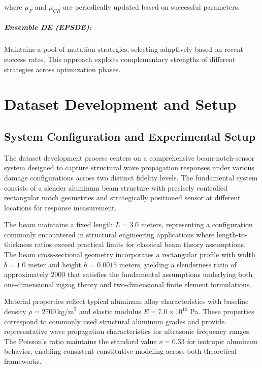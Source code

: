 \documentclass[12pt,a4paper]{report}
\begin{document}
where $\mu_F$ and $\mu_{CR}$ are periodically updated based on successful parameters.

\paragraph{Ensemble DE (EPSDE):}

Maintains a pool of mutation strategies, selecting adaptively based on recent success rates. This approach exploits complementary strengths of different strategies across optimization phases.


\chapter{Dataset Development and Setup}

\section{System Configuration and Experimental Setup}

The dataset development process centers on a comprehensive beam-notch-sensor system designed to capture structural wave propagation responses under various damage configurations across two distinct fidelity levels. The fundamental system consists of a slender aluminum beam structure with precisely controlled rectangular notch geometries and strategically positioned sensor at different locations for response measurement.



The beam maintains a fixed length $L = 3.0$ meters, representing a configuration commonly encountered in structural engineering applications where length-to-thickness ratios exceed practical limits for classical beam theory assumptions. The beam cross-sectional geometry incorporates a rectangular profile with width $b = 1.0$ meter and height $h = 0.0015$ meters, yielding a slenderness ratio of approximately $2000$ that satisfies the fundamental assumptions underlying both one-dimensional zigzag theory and two-dimensional finite element formulations.

Material properties reflect typical aluminum alloy characteristics with baseline density $\rho = 2700 \,\text{kg/m}^3$ and elastic modulus $E = 7.0 \times 10^{10}$ Pa. These properties correspond to commonly used structural aluminum grades and provide representative wave propagation characteristics for ultrasonic frequency ranges. The Poisson's ratio maintains the standard value $\nu = 0.33$ for isotropic aluminum behavior, enabling consistent constitutive modeling across both theoretical frameworks.
\end{document}
